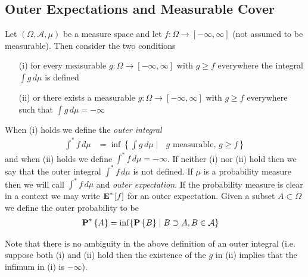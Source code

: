 \subsection{Outer Expectations and Measurable Cover}

\begin{defn}Let $(\Omega, \mathcal{A}, \mu)$ be a measure space and let $f : \Omega \to [-\infty, \infty]$ (not assumed to be measurable).  Then consider the two conditions
\begin{itemize}
\item [(i)] for every measurable $g : \Omega \to [-\infty, \infty]$ with $g \geq f$ everywhere the integral $\int g \, d\mu$ is defined 
\item [(ii)] or there exists a measurable $g : \Omega \to [-\infty, \infty]$  with $g \geq f$ everywhere such that $\int g \, d\mu = -\infty$ 
\end{itemize}
When (i) holds we define the \emph{outer integral}
\begin{align*}
\int^* {f} \, d\mu &= \inf \left \lbrace \int g  \, d\mu \mid \text{ $g$ measurable, } g \geq f \right \rbrace
\end{align*}
and when (ii) holds we define $\int^* f \, d\mu = -\infty$.
If neither (i) nor (ii) hold then we say that the outer integral $\int^* f \, d\mu$ is not defined.  If $\mu$ is a probability measure then we will call $\int^* f \, d\mu$ and \emph{outer expectation}.  If the probability measure is clear in a context we may write $\textbf{E}^*\left[f\right]$ for an outer expectation.  Given a subset $A \subset \Omega$ we define the outer probability to be
\begin{align*}
\textbf{P}^* \left \{A \right \} &= \inf \lbrace \textbf{P}\left \{B \right \} \mid B \supset A, B \in \mathcal{A} \rbrace
\end{align*}
\end{defn}

Note that there is no ambiguity in the above definition of an outer integral (i.e. suppose both (i) and (ii) hold then the existence of the $g$ in (ii) implies that the infimum in (i) is $-\infty$).

